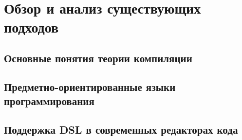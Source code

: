 \chapter{Обзор и анализ существующих подходов} \label{chapt1}

\section{Основные понятия теории компиляции} \label{sec11} 



 






\section{Предметно-ориентированные языки программирования} \label{sec12}



\section{Поддержка DSL в современных редакторах кода} \label{sec13}

